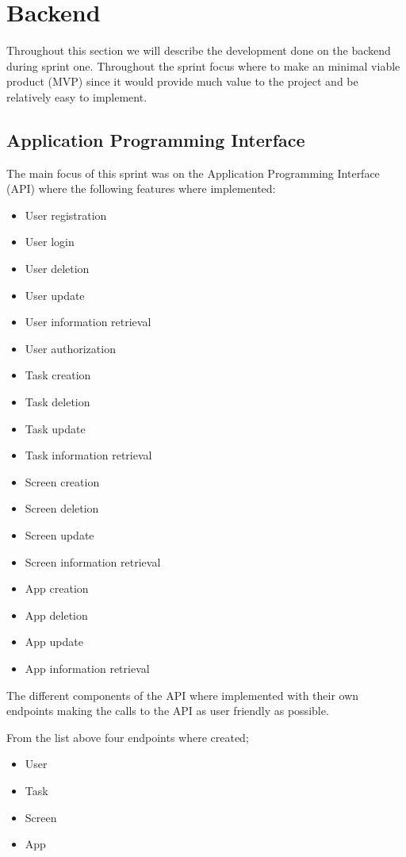 \section{Backend}

Throughout this section we will describe the development done on the backend during sprint one.
Throughout the sprint focus where to make an minimal viable product (MVP) since it would provide much value to the project and be relatively easy to implement.

\subsection{Application Programming Interface}

The main focus of this sprint was on the Application Programming Interface (API) where the following features where implemented:
\begin{itemize}
    \item User registration
    \item User login
    \item User deletion
    \item User update
    \item User information retrieval
    \item User authorization
    \item Task creation
    \item Task deletion
    \item Task update
    \item Task information retrieval
    \item Screen creation
    \item Screen deletion
    \item Screen update
    \item Screen information retrieval
    \item App creation
    \item App deletion
    \item App update
    \item App information retrieval
\end{itemize}

The different components of the API where implemented with their own endpoints making the calls to the API as user friendly as possible.

From the list above four endpoints where created;
\begin{itemize}
    \item User
    \item Task
    \item Screen
    \item App
\end{itemize}

